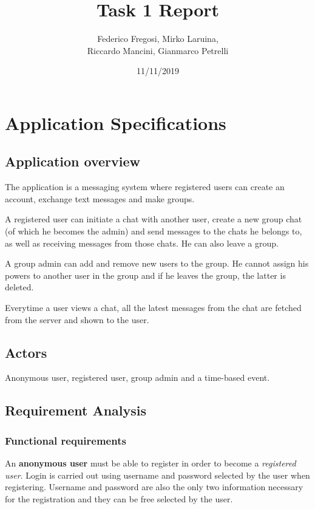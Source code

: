\documentclass[10pt]{article}
\title{Task 1 Report}
\date{11/11/2019}
\author{Federico Fregosi, Mirko Laruina,\\
        Riccardo Mancini, Gianmarco Petrelli}
\begin{document}
\maketitle
\vfill
\tableofcontents
\vfill
\clearpage
\setcounter{page}{1}

\section{Application Specifications}
\subsection{Application overview}
The application is a messaging system where registered users can create an 
account, exchange text messages and make groups.

A registered user can initiate a chat with another user, create a new group chat
(of which he becomes the admin) and send messages to the chats he belongs to,
as well as receiving messages from those chats. He can also leave a group.

A group admin can add and remove new users to the group. He cannot assign his
powers to another user in the group and if he leaves the group, the latter 
is deleted.

Everytime a user views a chat, all the latest messages from the chat are fetched from 
the server and shown to the user.

\subsection{Actors}
Anonymous user, registered user, group admin and a time-based event.

\subsection{Requirement Analysis}
\subsubsection{Functional requirements}

An \textbf{anonymous user} must be able to register in order to become a 
\emph{registered user}. Login is carried out using username and password selected 
by the user when registering. Username and password are also the only two information
necessary for the registration and they can be free selected by the user.
\end{document}
